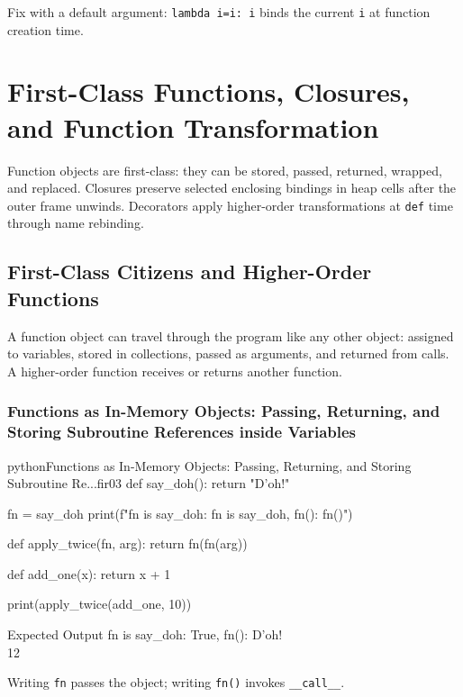 \documentclass[a4paper,twoside]{report}
\begin{document}
Fix with a default argument: \texttt{lambda i=i: i} binds the current \texttt{i} at function creation time.


\section{First-Class Functions, Closures, and Function Transformation}

Function objects are first-class: they can be stored, passed, returned, wrapped, and replaced. Closures preserve selected enclosing bindings in heap cells after the outer frame unwinds. Decorators apply higher-order transformations at \texttt{def} time through name rebinding.


\subsection{First-Class Citizens and Higher-Order Functions}

A function object can travel through the program like any other object: assigned to variables, stored in collections, passed as arguments, and returned from calls. A higher-order function receives or returns another function.

\subsubsection{Functions as In-Memory Objects: Passing, Returning, and Storing Subroutine References inside Variables}

\begin{codebox}[]{python}{Functions as In-Memory Objects: Passing, Returning, and Storing Subroutine Re...}{fir03}
def say_doh():
    return "D'oh!"

fn = say_doh
print(f"fn is say_doh: {fn is say_doh}, fn(): {fn()}")

def apply_twice(fn, arg):
    return fn(fn(arg))

def add_one(x):
    return x + 1

print(apply_twice(add_one, 10))
\end{codebox}


\begin{iobox}{Expected Output}
fn is say\_doh: True, fn(): D'oh! \\
12 \\
\end{iobox}




Writing \texttt{fn} passes the object; writing \texttt{fn()} invokes \texttt{\_\_call\_\_}.
\end{document}
